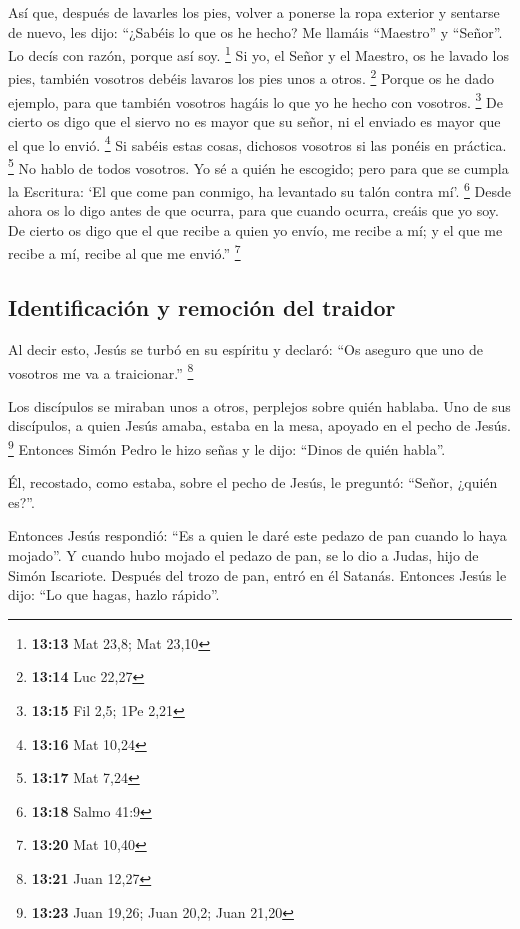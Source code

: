  Así que, después de lavarles los pies, volver a ponerse
la ropa exterior y sentarse de nuevo, les dijo: ``¿Sabéis lo que os he
hecho?  Me llamáis ``Maestro'' y ``Señor''. Lo decís con
razón, porque así soy. \footnote{\textbf{13:13} Mat 23,8; Mat 23,10}
 Si yo, el Señor y el Maestro, os he lavado los pies,
también vosotros debéis lavaros los pies unos a otros. \footnote{\textbf{13:14}
  Luc 22,27}  Porque os he dado ejemplo, para que también
vosotros hagáis lo que yo he hecho con vosotros. \footnote{\textbf{13:15}
  Fil 2,5; 1Pe 2,21}  De cierto os digo que el siervo no
es mayor que su señor, ni el enviado es mayor que el que lo envió.
\footnote{\textbf{13:16} Mat 10,24}  Si sabéis estas
cosas, dichosos vosotros si las ponéis en práctica. \footnote{\textbf{13:17}
  Mat 7,24}  No hablo de todos vosotros. Yo sé a quién he
escogido; pero para que se cumpla la Escritura: `El que come pan
conmigo, ha levantado su talón contra mí'. \footnote{\textbf{13:18}
  Salmo 41:9}  Desde ahora os lo digo antes de que
ocurra, para que cuando ocurra, creáis que yo soy.  De
cierto os digo que el que recibe a quien yo envío, me recibe a mí; y el
que me recibe a mí, recibe al que me envió.'' \footnote{\textbf{13:20}
  Mat 10,40}

\hypertarget{identificaciuxf3n-y-remociuxf3n-del-traidor}{%
\subsection{Identificación y remoción del
traidor}\label{identificaciuxf3n-y-remociuxf3n-del-traidor}}

 Al decir esto, Jesús se turbó en su espíritu y declaró:
``Os aseguro que uno de vosotros me va a traicionar.'' \footnote{\textbf{13:21}
  Juan 12,27}

 Los discípulos se miraban unos a otros, perplejos sobre
quién hablaba.  Uno de sus discípulos, a quien Jesús
amaba, estaba en la mesa, apoyado en el pecho de Jesús. \footnote{\textbf{13:23}
  Juan 19,26; Juan 20,2; Juan 21,20}  Entonces Simón
Pedro le hizo señas y le dijo: ``Dinos de quién habla''.

 Él, recostado, como estaba, sobre el pecho de Jesús, le
preguntó: ``Señor, ¿quién es?''.

 Entonces Jesús respondió: ``Es a quien le daré este
pedazo de pan cuando lo haya mojado''. Y cuando hubo mojado el pedazo de
pan, se lo dio a Judas, hijo de Simón Iscariote.  Después
del trozo de pan, entró en él Satanás. Entonces Jesús le dijo: ``Lo que
hagas, hazlo rápido''.

